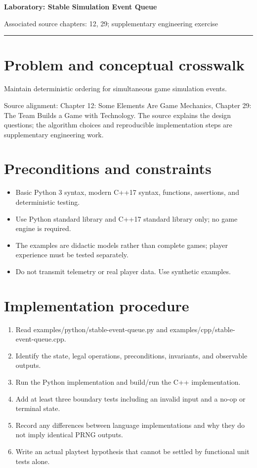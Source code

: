 \documentclass[11pt]{article}
\begin{document}
{\huge\bfseries\color{suiteblue} Laboratory: Stable Simulation Event Queue}\par
\vspace{0.15in}
{\normalsize\color{suitegray} Associated source chapters: 12, 29; supplementary engineering exercise}\par
\vspace{0.15in}\hrule\vspace{0.15in}

\section{Problem and conceptual crosswalk}
Maintain deterministic ordering for simultaneous game simulation events.

Source alignment: Chapter 12: Some Elements Are Game Mechanics, Chapter 29: The Team Builds a Game with Technology. The source explains the design questions; the algorithm choices and reproducible implementation steps are supplementary engineering work.


\section{Preconditions and constraints}
\begin{itemize}
\item Basic Python 3 syntax, modern C++17 syntax, functions, assertions, and deterministic testing.
\item Use Python standard library and C++17 standard library only; no game engine is required.
\item The examples are didactic models rather than complete games; player experience must be tested separately.
\item Do not transmit telemetry or real player data. Use synthetic examples.
\end{itemize}

\section{Implementation procedure}
\begin{enumerate}
\item Read examples/python/stable-event-queue.py and examples/cpp/stable-event-queue.cpp.
\item Identify the state, legal operations, preconditions, invariants, and observable outputs.
\item Run the Python implementation and build/run the C++ implementation.
\item Add at least three boundary tests including an invalid input and a no-op or terminal state.
\item Record any differences between language implementations and why they do not imply identical PRNG outputs.
\item Write an actual playtest hypothesis that cannot be settled by functional unit tests alone.
\end{enumerate}
\end{document}
